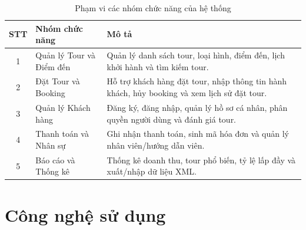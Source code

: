\begin{table}[H]
\centering
\renewcommand{\arraystretch}{1.5}

\begin{tabular}{|c|p{4.5cm}|p{7.5cm}|}
\hline

\centering \textbf{STT} &
\centering \textbf{Nhóm chức năng} &
\centering \textbf{Mô tả}
\tabularnewline
\hline

1 &
Quản lý Tour và Điểm đến &
Quản lý danh sách tour, loại hình, điểm đến, lịch khởi hành và tìm kiếm tour.
\tabularnewline
\hline

2 &
Đặt Tour và Booking &
Hỗ trợ khách hàng đặt tour, nhập thông tin hành khách, hủy booking và xem lịch sử đặt tour.
\tabularnewline
\hline

3 &
Quản lý Khách hàng &
Đăng ký, đăng nhập, quản lý hồ sơ cá nhân, phân quyền người dùng và đánh giá tour.
\tabularnewline
\hline

4 &
Thanh toán và Nhân sự &
Ghi nhận thanh toán, sinh mã hóa đơn và quản lý nhân viên/hướng dẫn viên.
\tabularnewline
\hline

5 &
Báo cáo và Thống kê &
Thống kê doanh thu, tour phổ biến, tỷ lệ lấp đầy và xuất/nhập dữ liệu XML.
\tabularnewline
\hline

\end{tabular}

\caption{Phạm vi các nhóm chức năng của hệ thống}
\label{table:phamvi}

\end{table}

\section{Công nghệ sử dụng}


